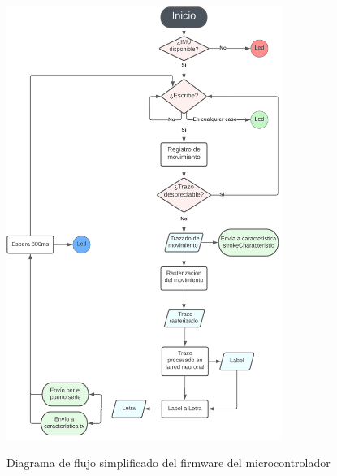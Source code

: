 \begin{figure}[h]
    \centering
    \includegraphics[width=0.8\textwidth]{capturas/DiagramaFlujoFirmware.png}\\[-0,48cm]
    \caption{Diagrama de flujo simplificado del firmware del microcontrolador}
\end{figure}